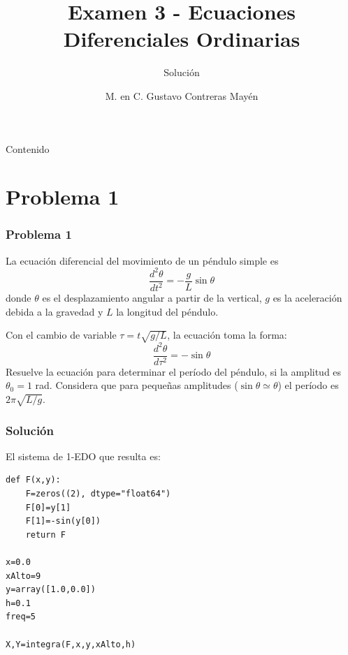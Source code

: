 


\title{Examen 3 - Ecuaciones Diferenciales Ordinarias}
\subtitle{Solución}
\author[]{M. en C. Gustavo Contreras Mayén}
\maketitle
\fontsize{14}{14}\selectfont
{}
\begin{frame}{Contenido}
\tableofcontents[pausesections]
\end{frame}
\section{Problema 1}
\begin{frame}
\frametitle{Problema 1}
La ecuación diferencial del movimiento de un péndulo simple es
\[ \dfrac{d^{2} \theta}{d t^{2}} = - \dfrac{g}{L} \sin \theta \]
donde $\theta$ es el desplazamiento angular a partir de la vertical, $g$ es la aceleración debida a la gravedad y $L$ la longitud del péndulo.
\end{frame}
\begin{frame}
Con el cambio de variable $\tau = t \sqrt{g/L}$, la ecuación toma la forma:
\[ \dfrac{d^{2} \theta}{d \tau^{2}} = -  \sin \theta\]
Resuelve la ecuación para determinar el período del péndulo, si la amplitud es $\theta_{0} = 1$ rad. Considera que para pequeñas amplitudes ($\sin \theta \simeq \theta$) el período es $2 \pi \sqrt{L/g}$.
\end{frame}
\begin{frame}[fragile]
\frametitle{Solución}
El sistema de 1-EDO que resulta es:
\begin{lstlisting}
def F(x,y):
    F=zeros((2), dtype="float64")
    F[0]=y[1]
    F[1]=-sin(y[0])
    return F

x=0.0
xAlto=9
y=array([1.0,0.0])
h=0.1
freq=5

X,Y=integra(F,x,y,xAlto,h)
\end{lstlisting}
\end{frame}

